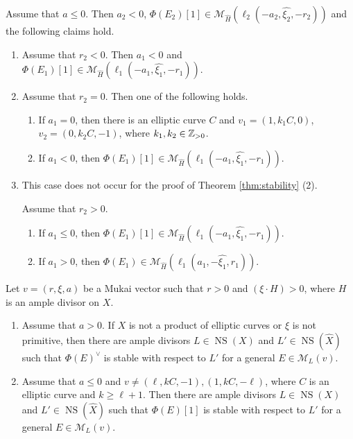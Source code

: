 \documentclass[10pt,a4paper]{amsart}
\newcommand{\NS}{\operatorname{NS}}
\newcommand{\cal}{\mathcal}
\begin{document}
\begin{lem}\label{lem:a<0}
Assume that $a \leq 0$.
Then
$a_2<0$,
$\Phi(E_2)[1] \in {\cal M}_{\widehat{H}}(\ell_2(-a_2,\widehat{\xi_2},-r_2))$
and the following claims hold.
\begin{enumerate}
\item[(1)]
Assume that $r_2<0$.
Then $a_1<0$ and $\Phi(E_1)[1] \in 
{\cal M}_{\widehat{H}}(\ell_1(-a_1,\widehat{\xi_1},-r_1))$.
\item[(2)]
Assume that $r_2=0$. Then one of the following holds.
\begin{enumerate}
\item
If $a_1=0$, then there is an elliptic curve $C$ and
$v_1=(1,k_1 C,0)$, $v_2=(0,k_2 C,-1)$, where $k_1,k_2 \in {\Bbb Z}_{>0}$.
\item
If $a_1<0$, then $\Phi(E_1)[1] \in {\cal M}_{\widehat{H}}(\ell_1(-a_1,\widehat{\xi_1},-r_1))$.
\end{enumerate}
\item[(3)]
\begin{NB}
This case does not occur for the proof of Theorem \ref{thm:stability} (2).
\end{NB}
Assume that $r_2>0$.
\begin{enumerate}
\item
 If $a_1 \leq 0$, then $\Phi(E_1)[1] \in {\cal M}_{\widehat{H}}(\ell_1(-a_1,\widehat{\xi_1},-r_1))$.
\item
If $a_1>0$, then $\Phi(E_1) \in  {\cal M}_{\widehat{H}}(\ell_1(a_1,-\widehat{\xi_1},r_1))$.
\end{enumerate}
\end{enumerate}
\end{lem}

\begin{thm}\label{thm:stability}
Let $v=(r,\xi,a)$ be a Mukai vector such that $r > 0$ and $(\xi \cdot H)>0$, where 
$H$ is an ample divisor on $X$.
\begin{enumerate}
\item[(1)]
Assume that $a>0$. 
If $X$ is not a product of elliptic curves or $\xi$ is not primitive,
then there are ample divisors $L \in \NS(X)$ and $L' \in \NS(\widehat{X})$ such that 
$\Phi(E)^{\vee}$ is stable with respect to $L'$ for a general
$E \in {\cal M}_L(v)$.
\item[(2)]
Assume that $a \leq 0$ and
$v \ne (\ell,kC,-1), (1,kC,-\ell)$, where 
$C$ is an elliptic curve and $k \geq \ell+1$. 
Then there are ample divisors $L \in \NS(X)$ and $L' \in \NS(\widehat{X})$ such that 
$\Phi(E)[1]$ is stable with respect to $L'$ for a general
$E \in {\cal M}_L(v)$.
\end{enumerate}
\end{thm}
\end{document}
